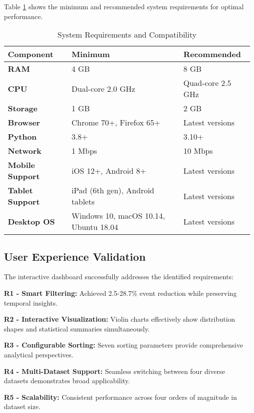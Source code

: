 \documentclass[11pt,a4paper]{article}
\begin{document}
Table \ref{tab:system_requirements} shows the minimum and recommended system requirements for optimal performance.

\begin{table}[H]
\centering
\caption{System Requirements and Compatibility}
\label{tab:system_requirements}
\begin{tabular}{@{}lll@{}}
\toprule
\textbf{Component} & \textbf{Minimum} & \textbf{Recommended} \\
\midrule
\textbf{RAM} & 4 GB & 8 GB \\
\textbf{CPU} & Dual-core 2.0 GHz & Quad-core 2.5 GHz \\
\textbf{Storage} & 1 GB & 2 GB \\
\textbf{Browser} & Chrome 70+, Firefox 65+ & Latest versions \\
\textbf{Python} & 3.8+ & 3.10+ \\
\textbf{Network} & 1 Mbps & 10 Mbps \\
\midrule
\textbf{Mobile Support} & iOS 12+, Android 8+ & Latest versions \\
\textbf{Tablet Support} & iPad (6th gen), Android tablets & Latest versions \\
\textbf{Desktop OS} & Windows 10, macOS 10.14, Ubuntu 18.04 & Latest versions \\
\bottomrule
\end{tabular}
\end{table}

\subsection{User Experience Validation}

The interactive dashboard successfully addresses the identified requirements:

\textbf{R1 - Smart Filtering:} Achieved 2.5-28.7\% event reduction while preserving temporal insights.

\textbf{R2 - Interactive Visualization:} Violin charts effectively show distribution shapes and statistical summaries simultaneously.

\textbf{R3 - Configurable Sorting:} Seven sorting parameters provide comprehensive analytical perspectives.

\textbf{R4 - Multi-Dataset Support:} Seamless switching between four diverse datasets demonstrates broad applicability.

\textbf{R5 - Scalability:} Consistent performance across four orders of magnitude in dataset size.
\end{document}
